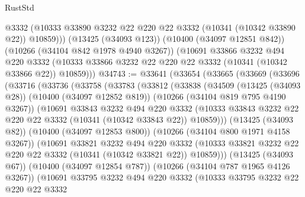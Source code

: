 \begin{lexlean}{RustStd}
\begin{coremodule}
{\begin{coremodule}
{{{{{{{{{{{{{{{{{{{{{{{{{          @3332
          (@10333 @33890 @3232 @22 @220 @22 @3332 (@10341 (@10342 @33890 @22)) @10859)))
      (@13425 (@34093 @123))
      (@10400 (@34097 @12851 @842))
      (@10266 (@34104 @842 @1978 @4940 @3267))
      (@10691
        @33866
        @3232
        @494
        @220
        @3332
        (@10333 @33866 @3232 @22 @220 @22 @3332 (@10341 (@10342 @33866 @22)) @10859)))
@34743 := @33641
    (@33654
      (@33665
        (@33669
          (@33696
            (@33716
              (@33736
                (@33758
                  (@33783
                    (@33812
                      (@33838
                        (@34509
                          (@13425 (@34093 @28))
                          (@10400 (@34097 @12852 @819))
                          (@10266 (@34104 @819 @795 @4190 @3267))
                          (@10691
                            @33843
                            @3232
                            @494
                            @220
                            @3332
                            (@10333
                              @33843
                              @3232
                              @22
                              @220
                              @22
                              @3332
                              (@10341 (@10342 @33843 @22))
                              @10859)))
                        (@13425 (@34093 @82))
                        (@10400 (@34097 @12853 @800))
                        (@10266 (@34104 @800 @1971 @4158 @3267))
                        (@10691
                          @33821
                          @3232
                          @494
                          @220
                          @3332
                          (@10333
                            @33821
                            @3232
                            @22
                            @220
                            @22
                            @3332
                            (@10341 (@10342 @33821 @22))
                            @10859)))
                      (@13425 (@34093 @67))
                      (@10400 (@34097 @12854 @787))
                      (@10266 (@34104 @787 @1965 @4126 @3267))
                      (@10691
                        @33795
                        @3232
                        @494
                        @220
                        @3332
                        (@10333
                          @33795
                          @3232
                          @22
                          @220
                          @22
                          @3332
}}}}}}}}}}}}}}}}}}}}}}}}}
\end{coremodule}}
\end{coremodule}
\end{lexlean}
